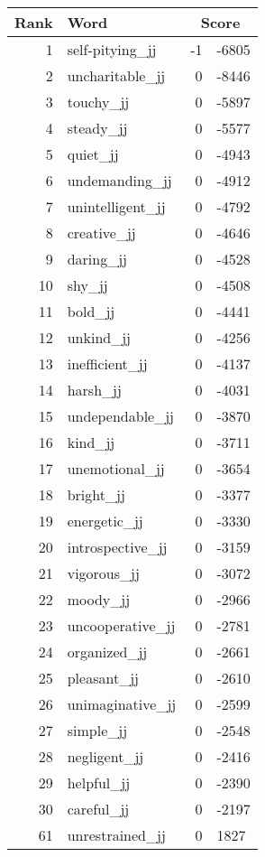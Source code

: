 \begin{longtable}[!htbp]{| rlr@{.}l |}
    \hline
    \textbf{Rank} & \textbf{Word} & \multicolumn{2}{c|}{\textbf{Score}} \\
    \hline
    \endhead
    1 & self-pitying\_jj & -1 & -6805 \\
    2 & uncharitable\_jj & 0 & -8446 \\
    3 & touchy\_jj & 0 & -5897 \\
    4 & steady\_jj & 0 & -5577 \\
    5 & quiet\_jj & 0 & -4943 \\
    6 & undemanding\_jj & 0 & -4912 \\
    7 & unintelligent\_jj & 0 & -4792 \\
    8 & creative\_jj & 0 & -4646 \\
    9 & daring\_jj & 0 & -4528 \\
    10 & shy\_jj & 0 & -4508 \\
    11 & bold\_jj & 0 & -4441 \\
    12 & unkind\_jj & 0 & -4256 \\
    13 & inefficient\_jj & 0 & -4137 \\
    14 & harsh\_jj & 0 & -4031 \\
    15 & undependable\_jj & 0 & -3870 \\
    16 & kind\_jj & 0 & -3711 \\
    17 & unemotional\_jj & 0 & -3654 \\
    18 & bright\_jj & 0 & -3377 \\
    19 & energetic\_jj & 0 & -3330 \\
    20 & introspective\_jj & 0 & -3159 \\
    21 & vigorous\_jj & 0 & -3072 \\
    22 & moody\_jj & 0 & -2966 \\
    23 & uncooperative\_jj & 0 & -2781 \\
    24 & organized\_jj & 0 & -2661 \\
    25 & pleasant\_jj & 0 & -2610 \\
    26 & unimaginative\_jj & 0 & -2599 \\
    27 & simple\_jj & 0 & -2548 \\
    28 & negligent\_jj & 0 & -2416 \\
    29 & helpful\_jj & 0 & -2390 \\
    30 & careful\_jj & 0 & -2197 \\
    61 & unrestrained\_jj & 0 & 1827 \\

\end{longtable}
